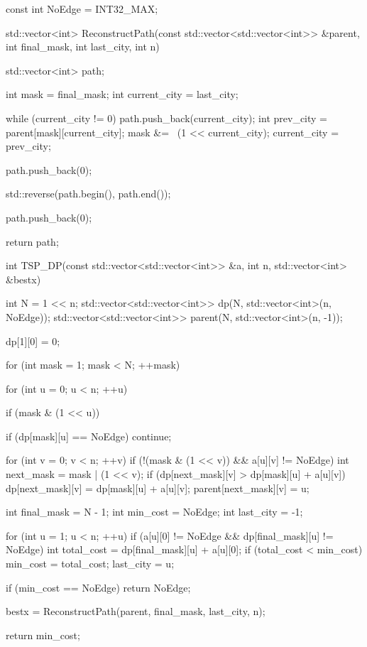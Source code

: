 \begin{cppcode}
const int NoEdge = INT32_MAX;

std::vector<int> ReconstructPath(const std::vector<std::vector<int>> &parent, int final_mask, int last_city, int n) {
    std::vector<int> path;
    
    int mask = final_mask;
    int current_city = last_city;

    while (current_city != 0) {
        path.push_back(current_city);
        int prev_city = parent[mask][current_city];
        mask &= ~(1 << current_city);
        current_city = prev_city;
    }

    path.push_back(0);

    std::reverse(path.begin(), path.end());

    path.push_back(0);

    return path;
}

int TSP_DP(const std::vector<std::vector<int>> &a, int n, std::vector<int> &bestx) {
    int N = 1 << n;
    std::vector<std::vector<int>> dp(N, std::vector<int>(n, NoEdge));
    std::vector<std::vector<int>> parent(N, std::vector<int>(n, -1));

    dp[1][0] = 0;

    for (int mask = 1; mask < N; ++mask) {
        for (int u = 0; u < n; ++u) {
            if (mask & (1 << u)) {
                if (dp[mask][u] == NoEdge) continue;

                for (int v = 0; v < n; ++v) {
                    if (!(mask & (1 << v)) && a[u][v] != NoEdge) {
                        int next_mask = mask | (1 << v);
                        if (dp[next_mask][v] > dp[mask][u] + a[u][v]) {
                            dp[next_mask][v] = dp[mask][u] + a[u][v];
                            parent[next_mask][v] = u;
                        }
                    }
                }
            }
        }
    }

    int final_mask = N - 1; 
    int min_cost = NoEdge;
    int last_city = -1;

    for (int u = 1; u < n; ++u) {
        if (a[u][0] != NoEdge && dp[final_mask][u] != NoEdge) {
            int total_cost = dp[final_mask][u] + a[u][0];
            if (total_cost < min_cost) {
                min_cost = total_cost;
                last_city = u;
            }
        }
    }

    if (min_cost == NoEdge) {
        return NoEdge;
    }

    bestx = ReconstructPath(parent, final_mask, last_city, n);

    return min_cost;
}
\end{cppcode}

